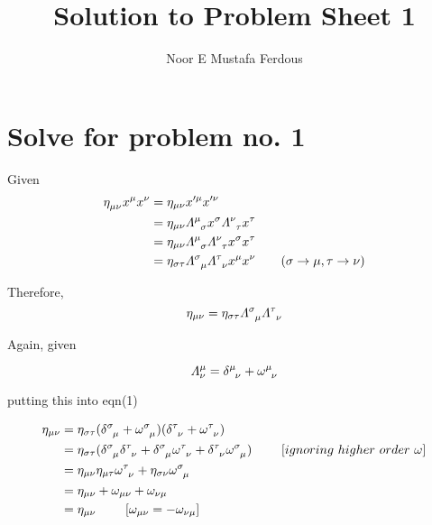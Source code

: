 \documentclass[12pt, letterpaper]{article}
\title{Solution to Problem Sheet 1}
\author{Noor E Mustafa Ferdous}
\date{}
\newcommand*{\1}{\hspace{1pt}}
\begin{document}
\maketitle

\section*{Solve for problem no. 1}
Given \\ 
\begin{align*}
    \eta \indices{_{\mu \nu}} x^{\mu} x^{\nu} &=  \eta _{\mu \nu} x^{\prime \mu} x^{\prime \nu} \\
    &= \eta_{\mu \nu} \varLambda \indices{^{\mu} _{\sigma}} x^{\sigma} \varLambda \indices{^{\nu} _{\tau}} x^{\tau} \\
    &= \eta_{\mu \nu} \varLambda \indices{^{\mu}_{\sigma}} \varLambda \indices{^{\nu} _{\tau}} x^{\sigma} x^{\tau} \\ 
    &= \eta_{\sigma \tau} \varLambda \indices{^{\sigma} _{\mu}} \varLambda \indices{^{\tau} _{\nu}} x^{\mu} x^{\nu} \tag{$\sigma \to \mu, \tau \to \nu$}\\
\end{align*}

Therefore,
\begin{equation}
    \eta _{\mu \nu} = \eta_{\sigma \tau} \varLambda \indices{^{\sigma} _{\mu}} \varLambda \indices{^{\tau} _{\nu}}
\end{equation}

Again, given

\begin{equation}
    \varLambda ^{\mu} _{\nu} = \delta \indices{^{\mu} _{\nu}} + \omega \indices{^{\mu} _{\nu}}
\end{equation}

putting this into eqn(1)

\begin{align*}
    \eta _{\mu \nu} &= \eta_{\sigma \tau} (\delta \indices{^{\sigma} _{\mu}} + \omega \indices{^{\sigma} _{\mu}})(\delta \indices{^{\tau} _{\nu}} + \omega \indices{^{\tau} _{\nu}}) \\ 
    &= \eta_{\sigma \tau}(\delta \indices{^{\sigma} _{\mu}} \delta \indices{^{\tau} _{\nu}} + \delta \indices{^{\sigma} _{\mu}} \omega \indices{^{\tau} _{\nu}} + \delta \indices{^{\tau} _{\nu}} \omega\indices{^{\sigma} _{\mu}}) \ \ \ \ \ \ \  [ignoring \  higher \   order \   \omega] \\
    &= \eta _{\mu \nu} \eta _{\mu \tau} \omega \indices{^{\tau} _{\nu}} + \eta _{\sigma \nu} \omega\indices{^{\sigma} _{\mu}} \\
    &= \eta _{\mu \nu} + \omega _{\mu \nu} + \omega _{\nu \mu} \\ 
    &= \eta _{\mu \nu} \ \ \ \ \ \ \  [ \omega _{\mu \nu} = - \omega _{\nu \mu}] \\
\end{align*}
\end{document}
